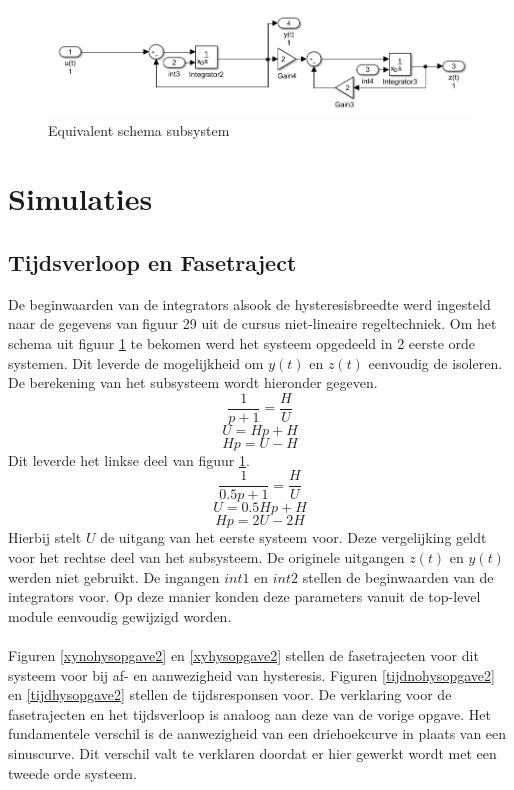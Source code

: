 \documentclass[12pt]{article}
\begin{document}
\begin{figure}[!h]
	\includegraphics[width=\textwidth ,keepaspectratio]{schemasubsystem2.png}
	\centering
	\caption{Equivalent schema subsystem}
	\label{schema2sub}
\end{figure} 
\section{Simulaties}
\subsection{Tijdsverloop en Fasetraject}
De beginwaarden van de integrators alsook de hysteresisbreedte werd ingesteld naar de gegevens van figuur 29 uit de cursus niet-lineaire regeltechniek. Om het schema uit figuur \ref{schema2sub} te bekomen werd het systeem opgedeeld in 2 eerste orde systemen. Dit leverde de mogelijkheid om $y(t)$ en $z(t)$ eenvoudig de isoleren. De berekening van het subsysteem wordt hieronder gegeven.
\begin{equation}
	\frac{1}{p+1} = \frac{H}{U}
\end{equation}
\begin{equation}
	U = Hp + H
\end{equation}
\begin{equation}
	Hp = U - H
\end{equation}
Dit leverde het linkse deel van figuur \ref{schema2sub}.
\begin{equation}
	\frac{1}{0.5p+1} = \frac{H}{U}
\end{equation}
\begin{equation}
	U = 0.5Hp + H
\end{equation}
\begin{equation}
	Hp = 2U - 2H
\end{equation}
Hierbij stelt $U$ de uitgang van het eerste systeem voor. Deze vergelijking geldt voor het rechtse deel van het subsysteem. De originele uitgangen $z(t)$ en $y(t)$ werden niet gebruikt. De ingangen $int1$ en $int2$ stellen de beginwaarden van de integrators voor. Op deze manier konden deze parameters vanuit de top-level module eenvoudig gewijzigd worden. \\ \\
Figuren \ref{xynohysopgave2} en \ref{xyhysopgave2} stellen de fasetrajecten voor dit systeem voor bij af- en aanwezigheid van hysteresis. Figuren \ref{tijdnohysopgave2} en \ref{tijdhysopgave2} stellen de tijdsresponsen voor. De verklaring voor de fasetrajecten en het tijdsverloop is analoog aan deze van de vorige opgave. Het fundamentele verschil is de aanwezigheid van een driehoekcurve in plaats van een sinuscurve. Dit verschil valt te verklaren doordat er hier gewerkt wordt met een tweede orde systeem.
\end{document}
